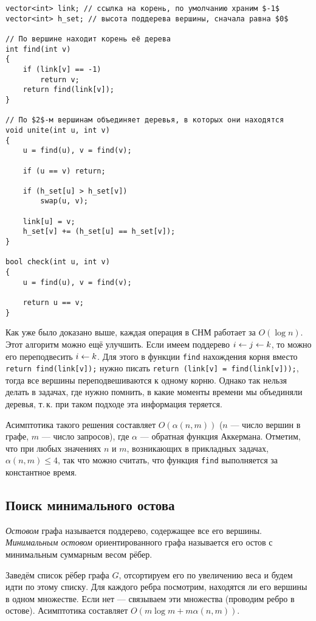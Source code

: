 \begin{verbatim}
vector<int> link; // ссылка на корень, по умолчанию храним $-1$
vector<int> h_set; // высота поддерева вершины, сначала равна $0$

// По вершине находит корень её дерева
int find(int v)
{
    if (link[v] == -1)
        return v;
    return find(link[v]);
}

// По $2$-м вершинам объединяет деревья, в которых они находятся
void unite(int u, int v)
{
    u = find(u), v = find(v);

    if (u == v) return;

    if (h_set[u] > h_set[v])
        swap(u, v);

    link[u] = v;
    h_set[v] += (h_set[u] == h_set[v]);
}

bool check(int u, int v)
{
    u = find(u), v = find(v);

    return u == v;
}
\end{verbatim}

Как уже было доказано выше, каждая операция в СНМ работает за $O(\log n)$. Этот алгоритм можно ещё улучшить. Если имеем поддерево $i \hm \ot j \ot k$, то можно его переподвесить $i \leftarrow k$. Для этого в функции \texttt{find} нахождения корня вместо \texttt{return find(link[v]);} нужно писать \texttt{return (link[v] = find(link[v]));}, тогда все вершины переподвешиваются к одному корню. Однако так нельзя делать в задачах, где нужно помнить, в какие моменты времени мы объединяли деревья, т.\,к. при таком подходе эта информация теряется.

Асимптотика такого решения составляет $O(\alpha(n, m))$ ($n$ --- число вершин в графе, $m$ --- число запросов), где $\alpha$ --- обратная функция Аккермана. Отметим, что при любых значениях $n$ и $m$, возникающих в прикладных задачах, $\alpha(n, m) \leqslant 4$, так что можно считать, что функция \texttt{find} выполняется за константное время.

\subsection{Поиск минимального остова}

\begin{definition}
    \textit{Остовом} графа называется поддерево, содержащее все его вершины. \textit{Минимальным остовом} ориентированного графа называется его остов с минимальным суммарным весом рёбер.
\end{definition}

\begin{algorithm}[Краскала]
    Заведём список рёбер графа $G$, отсортируем его по увеличению веса и будем идти по этому списку.  Для каждого ребра посмотрим, находятся ли его вершины в одном множестве. Если нет --- связываем эти множества (проводим ребро в остове). Асимптотика составляет $O(m\log m + m\alpha(n, m))$.
\end{algorithm}
